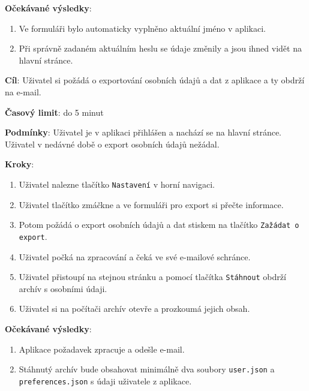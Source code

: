 \textbf{Očekávané výsledky}:

\begin{enumerate}[leftmargin=1.4cm]
    \item Ve formuláři bylo automaticky vyplněno aktuální jméno v aplikaci.
    \item Při správně zadaném aktuálním heslu se údaje změnily a jsou ihned vidět na hlavní stránce.
\end{enumerate}





\vspace{1em}

\textbf{Cíl}: Uživatel si požádá o exportování osobních údajů a dat z aplikace a ty obdrží na e-mail.

\textbf{Časový limit}: do 5 minut

\textbf{Podmínky}: Uživatel je v aplikaci přihlášen a nachází se na hlavní stránce. Uživatel v nedávné době o export osobních údajů nežádal.

\textbf{Kroky}:

\begin{enumerate}[leftmargin=1.4cm]
    \item Uživatel nalezne tlačítko \verb|Nastavení| v horní navigaci.
    \item Uživatel tlačítko zmáčkne a ve formuláři pro export si přečte informace.
    \item Potom požádá o export osobních údajů a dat stiskem na tlačítko \verb|Zažádat o export|.
    \item Uživatel počká na zpracování a čeká ve své e-mailové schránce.
    \item Uživatel přistoupí na stejnou stránku a pomocí tlačítka \verb|Stáhnout| obdrží archív s osobními údaji.
    \item Uživatel si na počítači archív otevře a prozkoumá jejich obsah.
\end{enumerate}

\textbf{Očekávané výsledky}:

\begin{enumerate}[leftmargin=1.4cm]
    \item Aplikace požadavek zpracuje a odešle e-mail.
    \item Stáhnutý archív bude obsahovat minimálně dva soubory  \verb|user.json| a \verb|preferences.json| s údaji uživatele z aplikace.
\end{enumerate}

